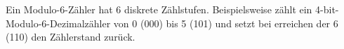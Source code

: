 Ein Modulo-6-Zähler hat 6 diskrete Zählstufen. Beispielsweise zählt ein
4-bit-Modulo-6-Dezimalzähler von 0 (000) bis 5 (101) und setzt bei erreichen der
6 (110) den Zählerstand zurück.